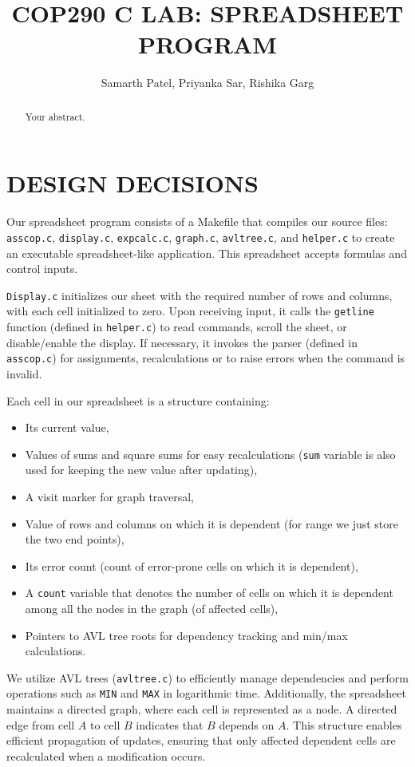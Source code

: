 \documentclass[a4paper]{article}
\title{COP290 C LAB: SPREADSHEET PROGRAM}
\author{Samarth Patel, Priyanka Sar, Rishika Garg}
\begin{document}
\maketitle

\begin{abstract}
Your abstract.
\end{abstract}

\section{DESIGN DECISIONS}

Our spreadsheet program consists of a Makefile that compiles our source files: \texttt{asscop.c}, \texttt{display.c}, \texttt{expcalc.c}, \texttt{graph.c}, \texttt{avltree.c}, and \texttt{helper.c} to create an executable spreadsheet-like application. This spreadsheet accepts formulas and control inputs.

\texttt{Display.c} initializes our sheet with the required number of rows and columns, with each cell initialized to zero. Upon receiving input, it calls the \texttt{getline} function (defined in \texttt{helper.c}) to read commands, scroll the sheet, or disable/enable the display. If necessary, it invokes the parser (defined in \texttt{asscop.c}) for assignments, recalculations or to raise errors when the command is invalid. 

Each cell in our spreadsheet is a structure containing:
\begin{itemize}
    \item Its current value,
    \item Values of sums and square sums for easy recalculations (\texttt{sum} variable is also used for keeping the new value after updating),
    \item A visit marker for graph traversal,
    \item Value of rows and columns on which it is dependent (for range we just store the two end points),
    \item Its error count (count of error-prone cells on which it is dependent),
    \item A \texttt{count} variable that denotes the number of cells on which it is dependent among all the nodes in the graph (of affected cells),
    \item Pointers to AVL tree roots for dependency tracking and min/max calculations.
\end{itemize}

We utilize AVL trees (\texttt{avltree.c}) to efficiently manage dependencies and perform operations such as \texttt{MIN} and \texttt{MAX} in logarithmic time. Additionally, the spreadsheet maintains a directed graph, where each cell is represented as a node. A directed edge from cell $A$ to cell $B$ indicates that $B$ depends on $A$. This structure enables efficient propagation of updates, ensuring that only affected dependent cells are recalculated when a modification occurs.
\end{document}
